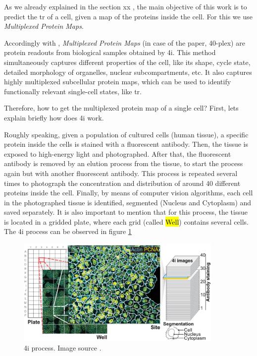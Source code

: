 As we already explained in the section xx , the main objective of this work is to predict the \Gls{tr} of a cell, given a map of the proteins inside the cell. For this we use \textit{Multiplexed Protein Maps}.

Accordingly with \cite{Guteaar7042}, \textit{Multiplexed Protein Maps} (in case of the paper, 40-plex) are protein readouts from biological samples obtained by \Gls{4i}. This method simultaneously captures different properties of the cell, like its shape, cycle state, detailed morphology of organelles, nuclear subcompartments, etc. It also captures highly multiplexed subcellular protein maps, which can be used to identify functionally relevant single-cell states, like \Gls{tr}.

Therefore, how to get the multiplexed protein map of a single cell? First, lets explain briefly how does \gls{4i} work.

Roughly speaking, given a population of cultured cells (human tissue), a specific protein inside the cells is stained with a fluorescent antibody. Then, the tissue is exposed to high-energy light and photographed. After that, the fluorescent antibody is removed by an elution process from the tissue, to start the process again but with another fluorescent antibody. This process is repeated several times to photograph the concentration and distribution of around 40 different proteins inside the cell. Finally, by means of computer vision algorithms, each cell in the photographed tissue is identified, segmented (Nucleus and Cytoplasm) and saved separately. It is also important to mention that for this process, the tissue is located in a gridded plate, where each grid (called \hl{Well}) contains several cells. The \gls{4i} process can be observed in figure \cref{fig:4i}


\begin{figure}[htb]
  \centering
  \includegraphics[width=100mm]{./Sections/Images/plate-well.png}
  \caption{\Acrlong{4i} process. Image source \cite{Guteaar7042}.}
  \label{fig:4i}
\end{figure}

